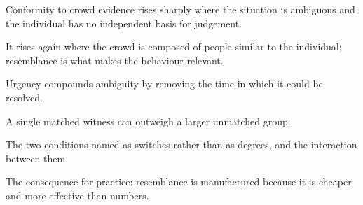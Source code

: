 

\begin{distilled}
  \item Conformity to crowd evidence rises sharply where the situation is ambiguous and the individual has no independent basis for judgement.
  \item It rises again where the crowd is composed of people similar to the individual; resemblance is what makes the behaviour relevant.
  \item Urgency compounds ambiguity by removing the time in which it could be resolved.
  \item A single matched witness can outweigh a larger unmatched group.
\end{distilled}

\begin{unique}
  \item The two conditions named as switches rather than as degrees, and the interaction between them.
  \item The consequence for practice: resemblance is manufactured because it is cheaper and more effective than numbers.
\end{unique}
